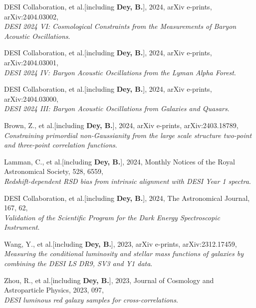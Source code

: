 \item DESI Collaboration, et al.[including \textbf{Dey, B.}], 2024, arXiv e-prints, arXiv:2404.03002, \\ \textit{DESI 2024 VI: Cosmological Constraints from the Measurements of Baryon Acoustic Oscillations}. 
 

\item DESI Collaboration, et al.[including \textbf{Dey, B.}], 2024, arXiv e-prints, arXiv:2404.03001, \\ \textit{DESI 2024 IV: Baryon Acoustic Oscillations from the Lyman Alpha Forest}. 
 

\item DESI Collaboration, et al.[including \textbf{Dey, B.}], 2024, arXiv e-prints, arXiv:2404.03000, \\ \textit{DESI 2024 III: Baryon Acoustic Oscillations from Galaxies and Quasars}. 
 

\item Brown, Z., et al.[including \textbf{Dey, B.}], 2024, arXiv e-prints, arXiv:2403.18789, \\ \textit{Constraining primordial non-Gaussianity from the large scale structure two-point and three-point correlation functions}. 
 

\item Lamman, C., et al.[including \textbf{Dey, B.}], 2024, Monthly Notices of the Royal Astronomical Society, 528, 6559, \\ \textit{Redshift-dependent RSD bias from intrinsic alignment with DESI Year 1 spectra}. 
 

\item DESI Collaboration, et al.[including \textbf{Dey, B.}], 2024, The Astronomical Journal, 167, 62, \\ \textit{Validation of the Scientific Program for the Dark Energy Spectroscopic Instrument}. 
 

\item Wang, Y., et al.[including \textbf{Dey, B.}], 2023, arXiv e-prints, arXiv:2312.17459, \\ \textit{Measuring the conditional luminosity and stellar mass functions of galaxies by combining the DESI LS DR9, SV3 and Y1 data}. 
 

\item Zhou, R., et al.[including \textbf{Dey, B.}], 2023, Journal of Cosmology and Astroparticle Physics, 2023, 097, \\ \textit{DESI luminous red galaxy samples for cross-correlations}. 
 

